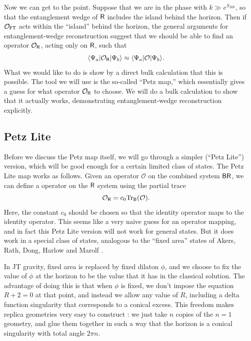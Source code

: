 \documentclass[11pt]{article}
\newcommand{\be}{\begin{equation}}
\newcommand{\ee}{\end{equation}}
\numberwithin{equation}{section}
\def\tr{\text{Tr}}
\begin{document}
Now we can get to the point. Suppose that we are in the phase with $k \gg e^{S_{BH}}$, so that the entanglement wedge of $\sf{R}$ includes the island behind the horizon. Then if $\mathcal{O}_{\sf{FT}}$ acts within the ``island'' behind the horizon, the general arguments for entanglement-wedge reconstruction suggest that we should be able to find an operator $\mathcal{O}_{\sf{R}}$, acting only on $\sf{R}$, such that 
\be
\langle \Psi_a|\mathcal{O}_{\sf{R}}|\Psi_b\rangle \approx \langle \Psi_a|\mathcal{O}|\Psi_b\rangle.\label{toCheck}
\ee
What we would like to do is show by a direct bulk calculation that this is possible. The tool we will use is the so-called ``Petz map,'' which essentially gives a guess for what operator $\mathcal{O}_{\sf{R}}$ to choose. We will do a bulk calculation to show that it actually works, demonstrating entanglement-wedge reconstruction explicitly.


\subsection{Petz Lite} \label{sec:petzlite}
Before we discuss the Petz map itself, we will go through a simpler (``Petz Lite'') version, which will be good enough for a certain limited class of states. The Petz Lite map works as follows. Given an operator $\mathcal{O}$ on the combined system $\sf{BR}$, we can define a operator on the $\sf{R}$ system using the partial trace
\be
\mathcal{O}_{\sf{R}} = c_0\tr_{\sf{B}}(\mathcal{O}).\label{petzLITE}
\ee
Here, the constant $c_0$ should be chosen so that the identity operator maps to the identity operator. This seems like a very naive guess for an operator mapping, and in fact this Petz Lite version will not work for general states. But it does work in a special class of states, analogous to the ``fixed area'' states of Akers, Rath, Dong, Harlow and Marolf \cite{Akers:2018fow,Dong:2018seb}.

In JT gravity, fixed area is replaced by fixed dilaton $\phi$, and we choose to fix the value of $\phi$ at the horizon to be the value that it has in the classical solution. The advantage of doing this is that when $\phi$ is fixed, we don't impose the equation $R + 2 = 0$ at that point, and instead we allow any value of $R$, including a delta function singularity that corresponds to a conical excess. This freedom makes replica geometries very easy to construct \cite{Akers:2018fow,Dong:2018seb}: we just take $n$ copies of the $n = 1$ geometry, and glue them together in such a way that the horizon is a conical singularity with total angle $2\pi n$.
\end{document}
